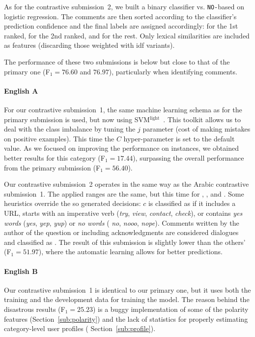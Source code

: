 As for the contrastive submission~2, we built a binary classifier \dir vs. 
\texttt{NO-}\dir based on logistic regression. The comments are then sorted 
according to the classifier's prediction confidence and the final labels are 
assigned accordingly: \dir for the 1st ranked, \rel for the 2nd ranked, and 
\irel for the rest. Only lexical similarities are included as features 
(discarding those weighted with idf variants).


The performance of these two submissions is below but close to that of the 
primary one (F$_1=76.60$ and $76.97$), particularly when identifying \irel 
comments. 

\paragraph{English A}

For our contrastive submission~1, the same machine learning schema as for the 
primary submission is used, but now using 
SVM$^\mathrm{light}$~\cite{Joachims:99}. This toolkit allows us to deal with 
the class imbalance by tuning the $j$ parameter (cost of making mistakes on 
positive examples). This time the $C$ hyper-parameter is set to the default 
value. As we focused on improving the performance on \pot instances, we 
obtained better results for this category (F$_1=17.44$), surpassing the overall 
performance from the primary submission (F$_1=56.40$).

Our contrastive submission~2 operates in the same way as the Arabic contrastive 
submission~1. The applied ranges are the same, but this time for \good, \pot, 
and \bad. Some heuristics override the so generated decisions: $c$ is classified 
as \good if it includes a URL, starts with an imperative verb (\eg \textit{try}, 
\textit{view}, \textit{contact}, \textit{check}), or contains \textit{yes words} 
(\eg \textit{yes}, \textit{yep}, \textit{yup}) or \textit{no words} (\eg 
\textit{no}, \textit{nooo}, \textit{nope}). Comments written by the author of 
the question or including acknowledgments are considered dialogues and 
classified as \bad. The result of this submission is slightly lower than the 
others' (F$_1=51.97$), where the automatic learning allows for better 
predictions.

\paragraph{English B}

Our contrastive submission~1 is identical to our primary one, but it uses both 
the training and the development data for training the model. The reason behind 
the disastrous results (F$_1=25.23$) is a buggy implementation of some of the 
polarity features (\cf Section~\ref{sub:polarity}) and the lack of statistics 
for properly estimating category-level user profiles (\cf 
Section~\ref{sub:profile}). 
 
